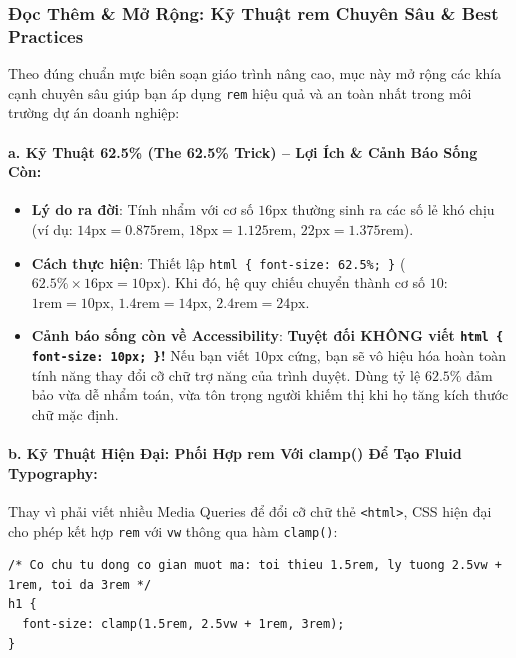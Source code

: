 \documentclass[11pt,oneside]{book}
\newcommand{\codeinline}[1]{\textcolor{accentOrange}{\texttt{#1}}}
\begin{document}
\subsubsection{Đọc Thêm \& Mở Rộng: Kỹ Thuật rem Chuyên Sâu \& Best Practices}

Theo đúng chuẩn mực biên soạn giáo trình nâng cao, mục này mở rộng các khía cạnh chuyên sâu giúp bạn áp dụng \codeinline{rem} hiệu quả và an toàn nhất trong môi trường dự án doanh nghiệp:

\paragraph{a. Kỹ Thuật 62.5\% (The 62.5\% Trick) -- Lợi Ích \& Cảnh Báo Sống Còn:}
\begin{itemize}[leftmargin=1.5em, itemsep=2pt, parsep=0pt]
    \item \textbf{Lý do ra đời}: Tính nhẩm với cơ số $16\text{px}$ thường sinh ra các số lẻ khó chịu (ví dụ: $14\text{px} = 0.875\text{rem}$, $18\text{px} = 1.125\text{rem}$, $22\text{px} = 1.375\text{rem}$).
    \item \textbf{Cách thực hiện}: Thiết lập \codeinline{html \{ font-size: 62.5\%; \}} ($62.5\% \times 16\text{px} = 10\text{px}$). Khi đó, hệ quy chiếu chuyển thành cơ số $10$: $1\text{rem} = 10\text{px}$, $1.4\text{rem} = 14\text{px}$, $2.4\text{rem} = 24\text{px}$.
    \item \textbf{Cảnh báo sống còn về Accessibility}: \textcolor{red!80!black}{\textbf{Tuyệt đối KHÔNG viết \codeinline{html \{ font-size: 10px; \}}!}} Nếu bạn viết $10\text{px}$ cứng, bạn sẽ vô hiệu hóa hoàn toàn tính năng thay đổi cỡ chữ trợ năng của trình duyệt. Dùng tỷ lệ $62.5\%$ đảm bảo vừa dễ nhẩm toán, vừa tôn trọng người khiếm thị khi họ tăng kích thước chữ mặc định.
\end{itemize}

\paragraph{b. Kỹ Thuật Hiện Đại: Phối Hợp rem Với clamp() Để Tạo Fluid Typography:}
Thay vì phải viết nhiều Media Queries để đổi cỡ chữ thẻ \codeinline{<html>}, CSS hiện đại cho phép kết hợp \codeinline{rem} với \codeinline{vw} thông qua hàm \codeinline{clamp()}:

\begin{codeWindow}
\begin{lstlisting}[language=CSS3]
/* Co chu tu dong co gian muot ma: toi thieu 1.5rem, ly tuong 2.5vw + 1rem, toi da 3rem */
h1 {
  font-size: clamp(1.5rem, 2.5vw + 1rem, 3rem);
}
\end{lstlisting}
\end{codeWindow}
\end{document}
